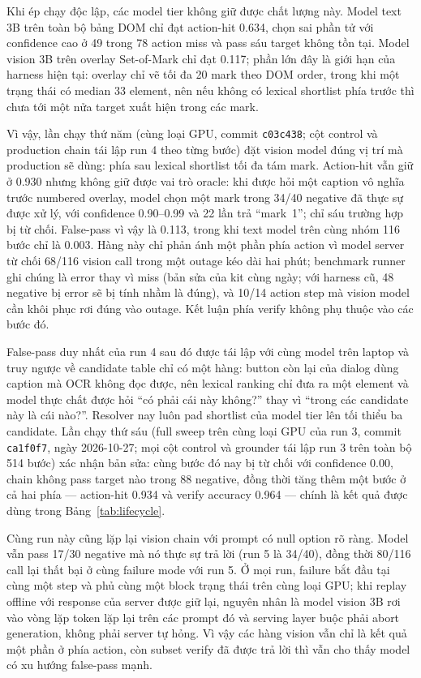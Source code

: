 \documentclass[11pt,a4paper]{article}
\newcommand{\code}[1]{\texttt{#1}}
\begin{document}
Khi ép chạy độc lập, các model tier không giữ được chất lượng này. Model text 3B trên
toàn bộ bảng DOM chỉ đạt action-hit 0.634, chọn sai phần tử với confidence cao ở 49
trong 78 action miss và pass sáu target không tồn tại. Model vision 3B trên overlay
Set-of-Mark chỉ đạt 0.117; phần lớn đây là giới hạn của harness hiện tại: overlay chỉ
vẽ tối đa 20 mark theo DOM order, trong khi một trạng thái có median 33 element, nên
nếu không có lexical shortlist phía trước thì chưa tới một nửa target xuất hiện trong
các mark.

Vì vậy, lần chạy thứ năm (cùng loại GPU, commit \code{c03c438}; cột control và
production chain tái lập run 4 theo từng bước) đặt vision model đúng vị trí mà production
sẽ dùng: phía sau lexical shortlist tối đa tám mark. Action-hit vẫn giữ ở 0.930 nhưng
không giữ được vai trò oracle: khi được hỏi một caption vô nghĩa trước numbered overlay,
model chọn một mark trong 34/40 negative đã thực sự được xử lý, với confidence
0.90--0.99 và 22 lần trả ``mark~1''; chỉ sáu trường hợp bị từ chối. False-pass vì vậy
là 0.113, trong khi text model trên cùng nhóm 116 bước chỉ là 0.003. Hàng này chỉ phản
ánh một phần phía action vì model server từ chối 68/116 vision call trong một outage
kéo dài hai phút; benchmark runner ghi chúng là error thay vì miss (bản sửa của kit
cùng ngày; với harness cũ, 48 negative bị error sẽ bị tính nhầm là đúng), và 10/14
action step mà vision model cần khôi phục rơi đúng vào outage. Kết luận phía verify
không phụ thuộc vào các bước đó.

False-pass duy nhất của run 4 sau đó được tái lập với cùng model trên laptop và truy
ngược về candidate table chỉ có một hàng: button còn lại của dialog dùng caption mà OCR
không đọc được, nên lexical ranking chỉ đưa ra một element và model thực chất được hỏi
``có phải cái này không?'' thay vì ``trong các candidate này là cái nào?''. Resolver
nay luôn pad shortlist của model tier lên tối thiểu ba candidate. Lần chạy thứ sáu
(full sweep trên cùng loại GPU của run 3, commit \code{ca1f0f7}, ngày 2026-10-27;
mọi cột control và grounder tái lập run 3 trên toàn bộ 514 bước) xác nhận bản sửa:
cùng bước đó nay bị từ chối với confidence 0.00, chain không pass target nào trong 88
negative, đồng thời tăng thêm một bước ở cả hai phía --- action-hit 0.934 và verify
accuracy 0.964 --- chính là kết quả được dùng trong Bảng~\ref{tab:lifecycle}.

Cùng run này cũng lặp lại vision chain với prompt có null option rõ ràng. Model vẫn pass
17/30 negative mà nó thực sự trả lời (run 5 là 34/40), đồng thời 80/116 call lại thất
bại ở cùng failure mode với run 5. Ở mọi run, failure bắt đầu tại cùng một step và phủ
cùng một block trạng thái trên cùng loại GPU; khi replay offline với response của server
được giữ lại, nguyên nhân là model vision 3B rơi vào vòng lặp token lặp lại trên các
prompt đó và serving layer buộc phải abort generation, không phải server tự hỏng. Vì
vậy các hàng vision vẫn chỉ là kết quả một phần ở phía action, còn subset verify đã
được trả lời thì vẫn cho thấy model có xu hướng false-pass mạnh.
\end{document}
